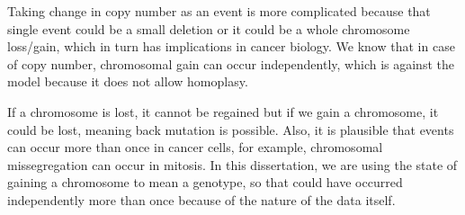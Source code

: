 
 Taking change in copy number as an event is more complicated because that single event could be a small deletion or it could be a whole chromosome loss/gain, which in turn has implications in cancer biology. We know that in case of copy number, chromosomal gain can occur independently, which is against the model because it does not allow homoplasy.

If a chromosome is lost, it cannot be regained but if we gain a chromosome, it could be lost, meaning back mutation is possible. Also, it is plausible that events can occur more than once in cancer cells, for example, chromosomal missegregation can occur in mitosis. In this dissertation, we are using the state of gaining a chromosome to mean a genotype, so that could have occurred independently more than once because of the nature of the data itself.

  




